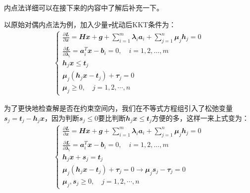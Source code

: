 \begin{note}
  内点法详细可以在接下来的内容中了解后补充一下。
\end{note}
以原始对偶内点法为例，加入少量$\mathbfit{\tau}$扰动后KKT条件为：
\begin{align}
  \begin{cases}
    \frac{\partial \mathbfit{L}}{\partial \mathbfit{x}}=\mathbfit{H}\mathbfit{x}+\mathbfit{g}+\sum_{i=1}^{m}\mathbfit{\lambda}_i\mathbfit{a}_i+\sum_{j=1}^{n}\mathbfit{\mu}_j\mathbfit{h}_j=0\\
    \frac{\partial \mathbfit{L}}{\partial \mathbfit{\lambda}_i}=\mathbfit{a}_i^T\mathbfit{x}-\mathbfit{b}_i=0, \quad i = 1, 2, \dots, m\\
    \mathbfit{h}_j\mathbfit{x}\leq\mathbfit{t}_j\\
    \mathbfit{\mu}_j(\mathbfit{h}_j\mathbfit{x}-\mathbfit{t}_j)+\mathbfit{\tau}_j=0\\
    \mathbfit{\mu}_j\geq 0, \quad j= 1, 2, \cdots, n
  \end{cases}
\end{align}

为了更快地检查解是否在约束空间内，我们在不等式方程组引入了松弛变量$\mathbfit{s}_j=\mathbfit{t}_j-\mathbfit{h}_j\mathbfit{x}$，因为判断$\mathbfit{s}_j\leq0$要比判断$\mathbfit{h}_j\mathbfit{x}\leq\mathbfit{t}_j$方便的多，这样一来上式变为：
\begin{align}
  \begin{cases}
    \frac{\partial \mathbfit{L}}{\partial \mathbfit{x}}=\mathbfit{H}\mathbfit{x}+\mathbfit{g}+\sum_{i=1}^{m}\mathbfit{\lambda}_i\mathbfit{a}_i+\sum_{j=1}^{n}\mathbfit{\mu}_j\mathbfit{h}_j=0\\
    \frac{\partial \mathbfit{L}}{\partial \mathbfit{\lambda}_i}=\mathbfit{a}_i^T\mathbfit{x}-\mathbfit{b}_i=0, \quad i = 1, 2, \dots, m\\
    \mathbfit{h}_j\mathbfit{x}+\mathbfit{s}_j=\mathbfit{t}_j\\
    \mathbfit{\mu}_j(\mathbfit{h}_j\mathbfit{x}-\mathbfit{t}_j)+\mathbfit{\tau}_j=0\to \mathbfit{\mu}_j\mathbfit{s}_j-\mathbfit{\tau}_j=0\\
    \mathbfit{\mu}_j,\mathbfit{s}_j\geq 0, \quad j= 1, 2, \cdots, n
  \end{cases}
\end{align}

